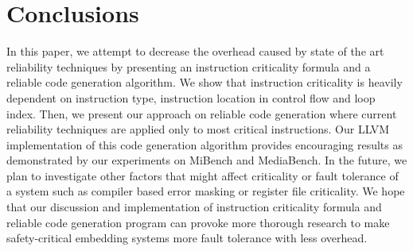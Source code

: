 \section{Conclusions}\label{sec:conclusion} 

In this paper, we attempt to decrease the overhead caused by state of the art reliability techniques by presenting an instruction criticality formula and a reliable code generation algorithm. We show that instruction criticality is heavily dependent on instruction type, instruction location in control flow and loop index. Then, we present our approach on reliable code generation where current reliability techniques are applied only to most critical instructions.  Our LLVM implementation of this code generation algorithm provides encouraging results as demonstrated by our experiments on MiBench and MediaBench. In the future, we plan to investigate other factors that might affect criticality or fault tolerance of a system such as compiler based error masking or register file criticality. We hope that our discussion and implementation of instruction criticality formula and reliable code generation program can provoke more thorough research to make safety-critical embedding systems more fault tolerance with less overhead.
